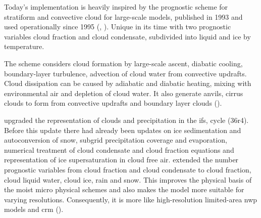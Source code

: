 Today's implementation is heavily inspired by the prognostic scheme for stratiform and convective cloud for large-scale models, published in 1993 and used operationally since 1995 (\cite{Tiedtke1993}, \cite{Tomkins2005}). Unique in its time with two prognostic variables cloud fraction and cloud condensate, subdivided into liquid and ice by temperature. 

The scheme considers cloud formation by large-scale ascent, diabatic cooling, boundary-layer turbulence, advection of cloud water from convective updrafts. Cloud dissipation can be caused by adiabatic and diabatic heating, mixing with environmental air and depletion of cloud water. It also generate anvils, cirrus clouds to form from convective updrafts and boundary layer clouds (\cite{Tiedtke1993}).

 upgraded the representation of clouds and precipitation in the \acrshort{ifs}, cycle (36r4). Before this update there had already been updates on ice sedimentation and autoconversion of snow, subgrid precipitation coverage and evaporation, numerical treatment of cloud condensate and cloud fraction equations and representation of ice supersaturation in cloud free air. \citeauthor{Forbes2011AnPrecipitation} extended the number prognostic variables from cloud fraction and cloud condensate to cloud fraction, cloud liquid water, cloud ice, rain and snow. This improves the physical basis of the moist micro physical schemes and also makes the model more suitable for varying resolutions. Consequently, it is more like high-resolution limited-area \acrshort{nwp} models and \acrshort{crm} (\cite{Forbes2011AnPrecipitation}).
